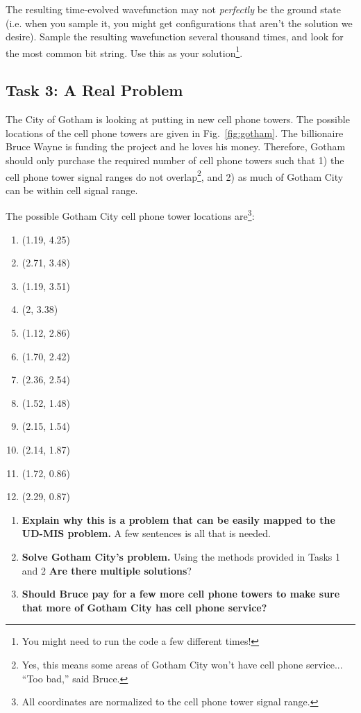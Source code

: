 \documentclass[12pt]{article}
\begin{document}
The resulting time-evolved wavefunction may not \textit{perfectly} be the ground state (i.e. when you sample it, you might get configurations that aren't the solution we desire).
Sample the resulting wavefunction several thousand times, and look for the most common bit string.
Use this as your solution\footnote{You might need to run the code a few different times!}.

\subsection*{Task 3: A Real Problem}

The City of Gotham is looking at putting in new cell phone towers.
The possible locations of the cell phone towers are given in Fig.~\ref{fig:gotham}.
The billionaire Bruce Wayne is funding the project and he loves his money. 
Therefore, Gotham should only purchase the required number of cell phone towers such that 1) the cell phone tower signal ranges do not overlap\footnote{Yes, this means some areas of Gotham City won't have cell phone service... ``Too bad,'' said Bruce.}, and 2) as much of Gotham City can be within cell signal range. 

The possible Gotham City cell phone tower locations are\footnote{All coordinates are normalized to the cell phone tower signal range.}:
\begin{enumerate}
	\item (1.19, 4.25)
	\item (2.71, 3.48)
	\item (1.19, 3.51)
	\item (2, 3.38)
	\item (1.12, 2.86)
	\item (1.70, 2.42)
	\item (2.36, 2.54)
	\item (1.52, 1.48)
	\item (2.15, 1.54)
	\item (2.14, 1.87)
	\item (1.72, 0.86)
	\item (2.29, 0.87)
\end{enumerate}

\begin{enumerate}
	\item {\bf Explain why this is a problem that can be easily mapped to the UD-MIS problem.} A few sentences is all that is needed.
	\item {\bf Solve Gotham City's problem.} Using the methods provided in Tasks 1 and 2 \textbf{Are there multiple solutions}?
	\item {\bf Should Bruce pay for a few more cell phone towers to make sure that more of Gotham City has cell phone service?}
\end{enumerate}
\end{document}
